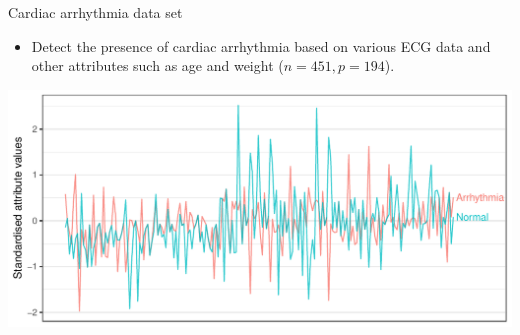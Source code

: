 \documentclass{beamer}\usepackage[]{graphicx}\usepackage[]{color}
\makeatletter
\def\maxwidth{ %
  \ifdim\Gin@nat@width>\linewidth
    \linewidth
  \else
    \Gin@nat@width
  \fi
}
\newenvironment{knitrout}{}{} %
\makeatother
\begin{document}
\begin{frame}[fragile]{Cardiac arrhythmia data set}
\vspace{-20pt}
\begin{itemize}
\item Detect the presence of cardiac arrhythmia based on various ECG data and other attributes such as age and weight ($n = 451, p = 194$).
\end{itemize}

\begin{knitrout}\small
{}\color{fgcolor}

{\centering \includegraphics[width=\maxwidth]{figure/plot_cardiac-1} 

}



\end{knitrout}
\end{frame}
\end{document}
